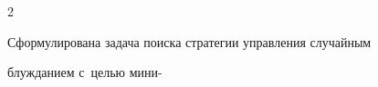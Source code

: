 \begin{multicols}{2}
  


\vspace*{-5pt}


  


  Сформулирована задача поиска стратегии управ\-ле\-ния случайным 


блужданием с~целью мини-\linebreak\vspace*{-12pt}





\pagebreak





\end{multicols}





